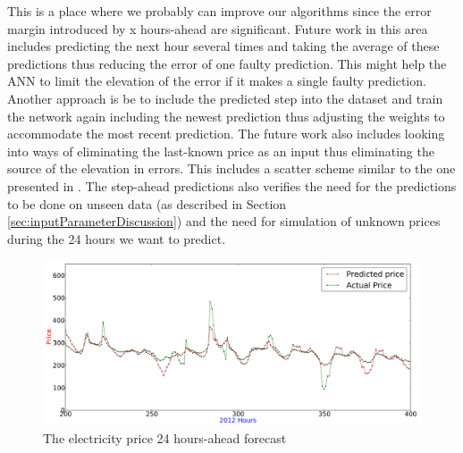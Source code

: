 This is a place where we probably can improve our algorithms since the error margin introduced by x hours-ahead are significant. Future work in this area includes predicting the next hour several times and taking the average of these predictions thus reducing the error of one faulty prediction. This might help the ANN to limit the elevation of the error if it makes a single faulty prediction. Another approach is be to include the predicted step into the dataset and train the network again including the newest prediction thus adjusting the weights to accommodate the most recent prediction. The future work also includes looking into ways of eliminating the last-known price as an input thus eliminating the source of the elevation in errors. This includes a scatter scheme similar to the one presented in \cite{singhal2011electricity}. The step-ahead predictions also verifies the need for the predictions to be done on unseen data (as described in Section \ref{sec:inputParameterDiscussion}) and the need for simulation of unknown prices during the 24 hours we want to predict. 

\begin{figure}[H]
\centering
\includegraphics[width=0.99\linewidth]{billeder/Discussion/24HourAhead_Price.png}
\caption{The electricity price 24 hours-ahead forecast}
\label{fig:24HourAheadPrice_Discussion}
\end{figure}


